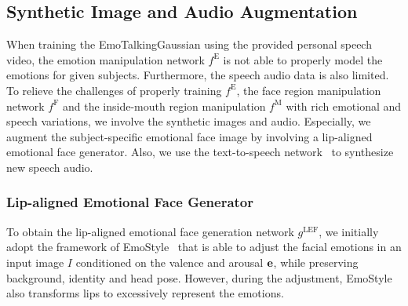 \subsection{Synthetic Image and Audio Augmentation}
When training the EmoTalkingGaussian using the provided personal speech video, the emotion manipulation network $f^\text{E}$ is not able to properly model the emotions for given subjects. Furthermore, the speech audio data is also limited. To relieve the challenges of properly training $f^\text{E}$, the face region manipulation network $f^\text{F}$ and the inside-mouth region manipulation $f^\text{M}$ with rich emotional and speech variations, we involve the synthetic images and audio. Especially, we augment the subject-specific emotional face image by involving a lip-aligned emotional face generator. Also, we use the text-to-speech network~\cite{gTTS} to synthesize new speech audio.

\subsubsection{Lip-aligned Emotional Face Generator} 
\label{sec:lip-aligned emotional face generator}

To obtain the lip-aligned emotional face generation network $g^\text{LEF}$, we initially adopt the framework of EmoStyle~\cite{azari2024emostyle} that is able to adjust the facial emotions in an input image $I$ conditioned on the valence and arousal $\mathbf{e}$, while preserving background, identity and head pose. However, during the adjustment, EmoStyle~\cite{azari2024emostyle} also transforms lips to excessively represent the emotions. 

